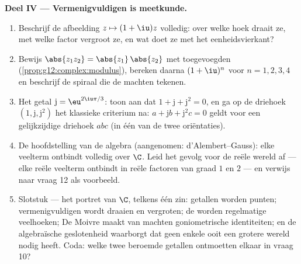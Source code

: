 \begin{problem}
\medskip
\noindent\textbf{Deel IV --- Vermenigvuldigen is meetkunde.}
\begin{enumerate}[resume]
  \item Beschrijf de afbeelding $z \mapsto (1 + \iu)z$ volledig: over welke
        hoek draait ze, met welke factor vergroot ze, en wat doet ze met het
        eenheidsvierkant?
  \item Bewijs $\abs{z_1 z_2} = \abs{z_1}\,\abs{z_2}$ met toegevoegden
        (\cref{prop:g12:complex:modulus}), bereken daarna $(1+\iu)^n$ voor
        $n = 1, 2, 3, 4$ en beschrijf de spiraal die de machten tekenen.
  \item Het getal $\mathrm{j} = \eu^{2\iu\pi/3}$: toon aan dat
        $1 + \mathrm{j} + \mathrm{j}^2 = 0$, en ga op de driehoek
        $\left(1, \mathrm{j}, \mathrm{j}^2\right)$ het klassieke criterium na:
        $a + \mathrm{j} b + \mathrm{j}^2 c = 0$ geldt voor een gelijkzijdige
        driehoek $abc$ (in één van de twee oriëntaties).
  \item De hoofdstelling van de algebra (aangenomen:
        d'Alembert--Gauss): elke veelterm ontbindt volledig over $\C$. Leid
        het gevolg voor de reële wereld af --- elke reële veelterm ontbindt in
        reële factoren van graad $1$ en $2$ --- en verwijs naar vraag 12 als
        voorbeeld.
  \item Slotstuk --- het portret van $\C$, telkens één zin: getallen worden
        punten; vermenigvuldigen wordt draaien en vergroten; de
         worden regelmatige veelhoeken; De Moivre maakt van
        machten goniometrische identiteiten; en de algebraïsche geslotenheid
        waarborgt dat geen enkele  ooit een grotere wereld nodig
        heeft. Coda: welke twee beroemde getallen ontmoetten elkaar in
        vraag 10?
\end{enumerate}
\end{problem}

